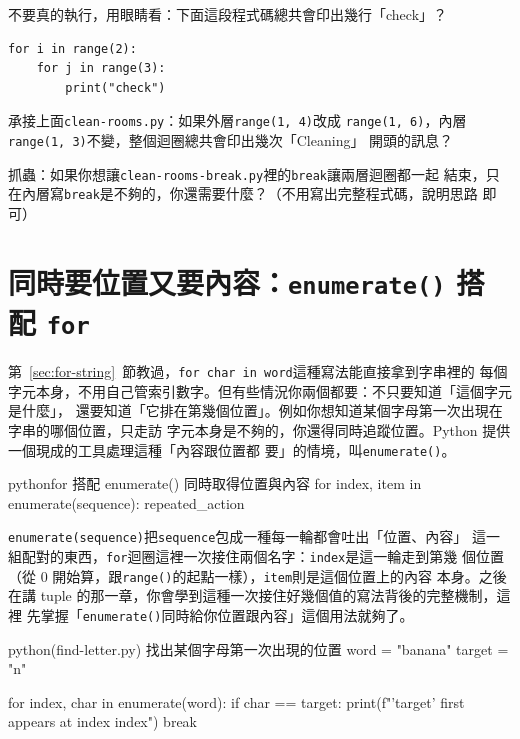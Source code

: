 \begin{drills}[label=drills:nested-loops]
\item 不要真的執行，用眼睛看：下面這段程式碼總共會印出幾行「check」？
\begin{verbatim}
for i in range(2):
    for j in range(3):
        print("check")
\end{verbatim}
\item 承接上面\texttt{clean-rooms.py}：如果外層\texttt{range(1, 4)}改成
\texttt{range(1, 6)}，內層\texttt{range(1, 3)}不變，整個迴圈總共會印出幾次「Cleaning」
開頭的訊息？
\item 抓蟲：如果你想讓\texttt{clean-rooms-break.py}裡的\texttt{break}讓兩層迴圈都一起
結束，只在內層寫\texttt{break}是不夠的，你還需要什麼？（不用寫出完整程式碼，說明思路
即可）
\end{drills}

\section{同時要位置又要內容：\texttt{enumerate()} 搭配 \texttt{for}}
\label{sec:enumerate}

第~\ref{sec:for-string}~節教過，\texttt{for char in word}這種寫法能直接拿到字串裡的
每個字元本身，不用自己管索引數字。但有些情況你兩個都要：不只要知道「這個字元是什麼」，
還要知道「它排在第幾個位置」。例如你想知道某個字母第一次出現在字串的哪個位置，只走訪
字元本身是不夠的，你還得同時追蹤位置。Python 提供一個現成的工具處理這種「內容跟位置都
要」的情境，叫\texttt{enumerate()}。

\begin{code}{python}{for 搭配 enumerate() 同時取得位置與內容}
for index, item in enumerate(sequence):
    repeated_action
\end{code}

\texttt{enumerate(sequence)}把\texttt{sequence}包成一種每一輪都會吐出「位置、內容」
這一組配對的東西，\texttt{for}迴圈這裡一次接住兩個名字：\texttt{index}是這一輪走到第幾
個位置（從 0 開始算，跟\texttt{range()}的起點一樣），\texttt{item}則是這個位置上的內容
本身。之後在講 tuple 的那一章，你會學到這種一次接住好幾個值的寫法背後的完整機制，這裡
先掌握「\texttt{enumerate()}同時給你位置跟內容」這個用法就夠了。

\begin{example}{python}{(find-letter.py) 找出某個字母第一次出現的位置}
word = "banana"
target = "n"

for index, char in enumerate(word):
    if char == target:
        print(f"'{target}' first appears at index {index}")
        break
\end{example}

